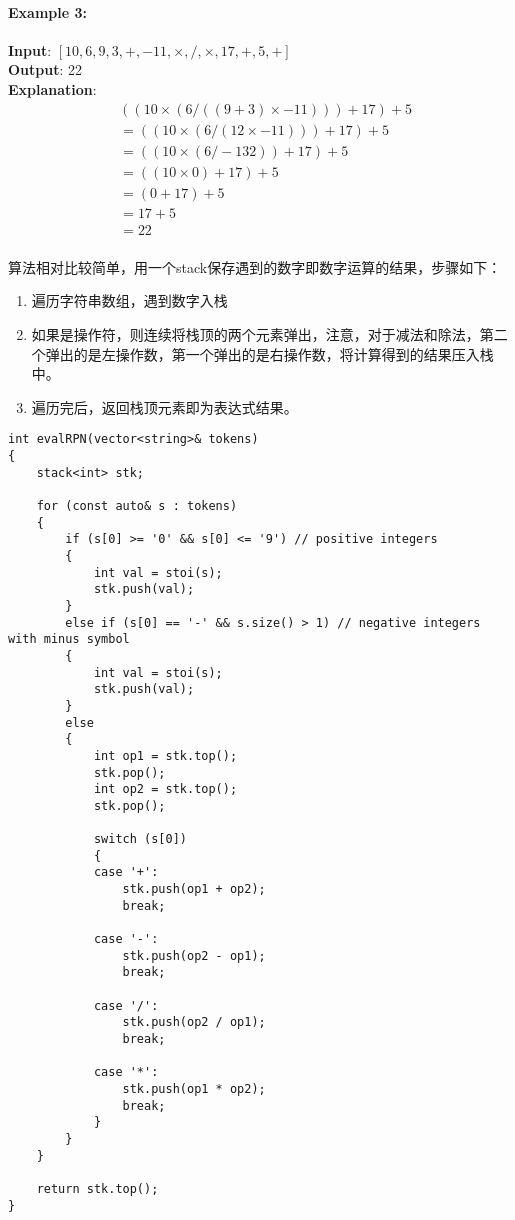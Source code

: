 \paragraph{Example 3:}
\begin{flushleft}
\textbf{Input}: $[10, 6, 9, 3, +, -11, \times, /, \times, 17, +, 5, +]$
\\
\textbf{Output}: 22
\\
\textbf{Explanation}:
\begin{align*}
& ((10 \times (6 / ((9 + 3) \times -11))) + 17) + 5 \\
&= ((10 \times (6 / (12 \times -11))) + 17) + 5 \\
&= ((10 \times (6 / -132)) + 17) + 5 \\
&= ((10 \times 0) + 17) + 5\\
&= (0 + 17) + 5\\
&= 17 + 5\\
&= 22\\
\end{align*}
\end{flushleft}
算法相对比较简单，用一个stack保存遇到的数字即数字运算的结果，步骤如下：
\begin{enumerate}
    \item 遍历字符串数组，遇到数字入栈
    \item 如果是操作符，则连续将栈顶的两个元素弹出，注意，对于减法和除法，第二个弹出的是左操作数，第一个弹出的是右操作数，将计算得到的结果压入栈中。
    \item 遍历完后，返回栈顶元素即为表达式结果。
\end{enumerate}
\setcounter{lstlisting}{0}
\begin{lstlisting}[style=customc, caption={Stack Based Approach}]
int evalRPN(vector<string>& tokens)
{
	stack<int> stk;
	
	for (const auto& s : tokens)
	{
		if (s[0] >= '0' && s[0] <= '9') // positive integers
		{
			int val = stoi(s);
			stk.push(val);
		}
		else if (s[0] == '-' && s.size() > 1) // negative integers with minus symbol
		{
			int val = stoi(s);
			stk.push(val);
		}
		else
		{
			int op1 = stk.top();
			stk.pop();
			int op2 = stk.top();
			stk.pop();

			switch (s[0])
			{
			case '+':
				stk.push(op1 + op2);
				break;

			case '-':
				stk.push(op2 - op1);
				break;

			case '/':
				stk.push(op2 / op1);
				break;

			case '*':
				stk.push(op1 * op2);
				break;
			}
		}
	}

	return stk.top();
}
\end{lstlisting}